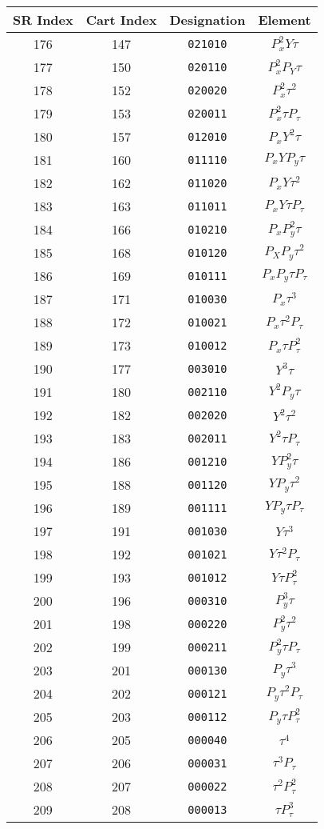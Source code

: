 {{\begin{center}
\newpage
\begin{tabular}{cccc}
SR Index&Cart Index&Designation&Element\\ \hline
  176&147&{\tt 021010}&$P_x^2Y{\tau}$\\
  177&150&{\tt 020110}&$P_x^2P_Y{\tau}$\\
  178&152&{\tt 020020}&$P_x^2{\tau}^{2}$\\
  179&153&{\tt 020011}&$P_x^2{\tau}P_{\tau}$\\
  180&157&{\tt 012010}&$P_xY^2{\tau}$\\
  181&160&{\tt 011110}&$P_xYP_y{\tau}$\\
  182&162&{\tt 011020}&$P_xY{\tau}^2$\\
  183&163&{\tt 011011}&$P_xY{\tau}P_{\tau}$\\
  184&166&{\tt 010210}&$P_xP_y^2{\tau}$\\
  185&168&{\tt 010120}&$P_XP_y{\tau}^2$\\
  186&169&{\tt 010111}&$P_xP_y{\tau}P_{\tau}$\\
  187&171&{\tt 010030}&$P_x{\tau}^3$\\
  188&172&{\tt 010021}&$P_x{\tau}^2P_{\tau}$\\
  189&173&{\tt 010012}&$P_x{\tau}P_{\tau}^2$\\
  190&177&{\tt 003010}&$Y^3{\tau}$\\
  191&180&{\tt 002110}&$Y^2P_y{\tau}$\\
  192&182&{\tt 002020}&$Y^2{\tau}^2$\\
  193&183&{\tt 002011}&$Y^2{\tau}P_{\tau}$\\
  194&186&{\tt 001210}&$YP_y^2{\tau}$\\
  195&188&{\tt 001120}&$YP_y{\tau}^2$\\
  196&189&{\tt 001111}&$YP_y{\tau}P_{\tau}$\\
  197&191&{\tt 001030}&$Y{\tau}^3$\\
  198&192&{\tt 001021}&$Y{\tau}^2P_{\tau}$\\
  199&193&{\tt 001012}&$Y{\tau}P_{\tau}^2$\\
  200&196&{\tt 000310}&$P_y^3{\tau}$\\
  201&198&{\tt 000220}&$P_y^2{\tau}^2$\\
  202&199&{\tt 000211}&$P_y^2{\tau}P_{\tau}$\\
  203&201&{\tt 000130}&$P_y{\tau}^3$\\
  204&202&{\tt 000121}&$P_y{\tau}^2P_{\tau}$\\
  205&203&{\tt 000112}&$P_y{\tau}P_{\tau}^2$\\
  206&205&{\tt 000040}&${\tau}^4$\\
  207&206&{\tt 000031}&${\tau}^3P_{\tau}$\\
  208&207&{\tt 000022}&${\tau}^2P_{\tau}^2$\\
  209&208&{\tt 000013}&${\tau}P_{\tau}^3$\\
\end{tabular}
\end{center}
}

}
